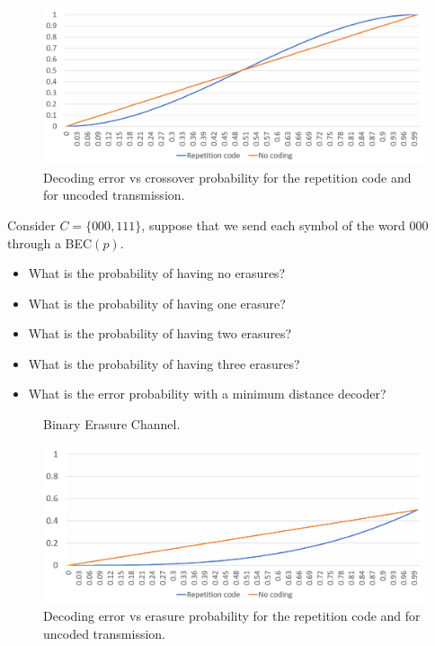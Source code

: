 \begin{figure}[h]
\begin{center}
\def\svgwidth{\columnwidth} 
\includegraphics[width=\linewidth]{figures/bscrepcode.png} 
\caption{Decoding error vs crossover probability for the repetition code and for uncoded transmission.}
\label{fig:bscrep}
\end{center}
\end{figure}


\begin{exercise}
Consider $C=\{000,111\}$, suppose that we send each symbol of the word 000 through a BEC$(p)$.
\begin{itemize}
\item What is the probability of having no erasures?
\item What is the probability of having one erasure?
\item What is the probability of having two erasures?
\item What is the probability of having three erasures?
\item What is the error probability with a minimum distance decoder?
\end{itemize}
\end{exercise}

\begin{figure}[h]
\begin{center}
\def\svgwidth{\columnwidth} 
 
\caption{Binary Erasure Channel.}
\label{fig:bec}
\end{center}
\end{figure}

\begin{figure}[h]
\begin{center}
\def\svgwidth{\columnwidth} 
\includegraphics[width=\linewidth]{figures/becrepcode.png} 
\caption{Decoding error vs erasure probability for the repetition code and for uncoded transmission.}
\label{fig:bscrep}
\end{center}
\end{figure}

